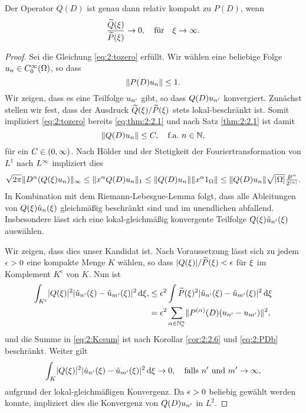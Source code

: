 \begin{thm}
Der Operator $Q(D)$ ist genau dann relativ kompakt zu $P(D)$,
wenn
\begin{equation}\label{eq:2:tozero}
\frac{\widetilde{Q}(\xi)}{\widetilde{P}(\xi)}\to0,\quad\text{für}\quad\xi\to\infty.
\end{equation}
\end{thm}
\begin{proof}
Sei die Gleichung \eqref{eq:2:tozero} erfüllt.
Wir wählen eine beliebige Folge $u_n\in C^\infty_0(\Omega)$,
so dass 
\begin{equation}\label{eq:2:PDb}
\lVert P(D)u_n\rVert\leq1.
\end{equation}
Wir zeigen, dass es eine Teilfolge $u_{n^\prime}$ gibt,
so dass $Q(D)u_{n^\prime}$ konvergiert.
Zunächst stellen wir fest, dass der Ausdruck $\widetilde{Q}(\xi)/\widetilde{P}(\xi)$
stets lokal-beschränkt ist.
Somit impliziert \eqref{eq:2:tozero} bereits \eqref{eq:thm:2:2.1}
und nach Satz \ref{thm:2:2.1} ist damit
\begin{equation}
\lVert Q(D)u_n\rVert\leq C,
\quad\text{f.a.}~n\in\mathbb N,
\end{equation}
für ein $C\in(0,\infty)$.
Nach Hölder und der Stetigkeit der Fouriertransformation
von $L^1$ nach $L^\infty$ impliziert dies
\begin{equation}
\sqrt{2\pi}\lVert D^\alpha(Q(\xi)u_n)\rVert_\infty\leq\lVert x^\alpha Q(D)u_n\rVert_1\leq\lVert Q(D)u_n\rVert\lVert x^\alpha1_\Omega\rVert
\leq\lVert Q(D)u_n\rVert\sqrt{\lvert\Omega\rvert}\tfrac{B^\alpha}{2^{\lvert\alpha\rvert}}.
\end{equation}
In Kombination mit dem Riemann-Lebesgue-Lemma folgt,
dass alle Ableitungen von $Q(\xi)\hat{u}_n(\xi)$
gleichmäßig beschränkt sind und im unendlichen abfallend.
Insbesondere lässt sich eine lokal-gleichmäßig konvergente Teilfolge $Q(\xi)\hat{u}_{n^\prime}(\xi)$ auswählen.

Wir zeigen, dass dies unser Kandidat ist.
Nach Voraussetzung lässt sich zu jedem $\epsilon>0$ eine kompakte Menge $K$ wählen,
so dass $\lvert Q(\xi)\rvert/\widetilde{P}(\xi)<\epsilon$ für $\xi$ im Komplement $K^{\mathrm c}$ von $K$.
Nun ist
\begin{align}
\int_{K^{\mathrm c}}\lvert Q(\xi)\rvert^2\lvert\hat{u}_{n^\prime}(\xi)-\hat{u}_{m^\prime}(\xi)\rvert^2\,\mathrm d \xi,
&\leq\epsilon^2\int\widetilde{P}(\xi)^2\lvert\hat{u}_{n^\prime}(\xi)-\hat{u}_{m^\prime}(\xi)\rvert^2\,\mathrm d \xi\\
&=\epsilon^2\sum_{\alpha\in\mathbb N^n_0}\lVert P^{(\alpha)}(D)(u_{n^\prime}-u_{m^\prime})\rVert^2,\label{eq:2:Kcsum}
\end{align}
und die Summe in \eqref{eq:2:Kcsum} ist nach Korollar \ref{cor:2:2.6}
und \eqref{eq:2:PDb} beschränkt.
Weiter gilt
\begin{equation}
\int_K\lvert Q(\xi)\rvert^2\lvert\hat{u}_{n^\prime}(\xi)-\hat{u}_{m^\prime}(\xi)\rvert^2\,\mathrm d \xi\to0,
\quad\text{falls}~n^\prime~\text{und}~m^\prime\to\infty,
\end{equation}
aufgrund der lokal-gleichmäßigen Konvergenz.
Da $\epsilon>0$ beliebig gewählt werden konnte,
impliziert dies die Konvergenz von $Q(D)u_{n^\prime}$ in $L^2$.


\end{proof}
